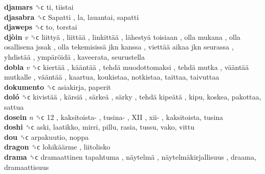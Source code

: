 \textbf{djamars} ␝ϲ  ti, tiistai  \\
\textbf{djasabra} ␝ϲ   Sapatti , la, lauantai, sapatti  \\
\textbf{djaweps} ␝ϲ  to, torstai  \\
\textbf{djòin} \emph{v}  ␝ϲ   liittyä ,  liittää ,  linkittää ,  lähestyä toisiaan ,  olla mukana ,  olla osallisena jssak ,  olla tekemisissä jkn kanssa ,  viettää aikaa jkn seurassa ,  yhdistää ,  ympäröidä , kaveerata, seurustella  \\
\textbf{dobla} \emph{v}  ␝ϲ   kiertää ,  kääntää ,  tehdä muodottomaksi ,  tehdä mutka ,  vääntää mutkalle ,  vääntää , kaartua, koukistaa, notkistaa, taittaa, taivuttaa  \\
\textbf{dokumento} ␝ϲ  asiakirja, paperit  \\
\textbf{doló} ␝ϲ   kivistää ,  kärsiä ,  särkeä ,  särky ,  tehdä kipeätä , kipu, koskea, pakottaa, sattua  \\
\textbf{dosein} \emph{n}  ␝ϲ   12 ,  kaksitoista- ,  tusina- ,  XII ,  xii- , kaksitoista, tusina  \\
\textbf{doshi} ␝ϲ  aski, laatikko, mirri, pillu, rasia, tussu, vako, vittu  \\
\textbf{dou} ␝ϲ  arpakuutio, noppa  \\
\textbf{dragon} ␝ϲ   lohikäärme , liitolisko  \\
\textbf{drama} ␝ϲ   dramaattinen tapahtuma ,  näytelmä ,  näytelmäkirjallisuus , draama, dramaattisuus  \\

